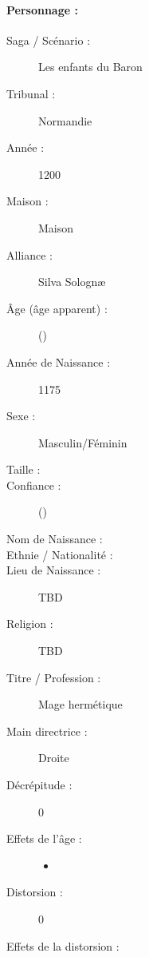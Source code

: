\pagestyle{fancy}
\thispagestyle{plain}
{\Large \paragraph*{\Large Personnage :} \magusname}
\begin{multicols}{2}
\begin{description}
\item[Saga / Scénario :] Les enfants du Baron
\item[Tribunal :] Normandie
\item[Année :] 1200
\item[Maison :] Maison
\item[Alliance :] Silva Solognæ
\item[Âge (âge apparent) :] \magusage{} (\magusapparentage)
\item[Année de Naissance :] 1175
\item[Sexe :] Masculin/Féminin
\item[Taille :] \magussize
\item[Confiance :] \magusconfidencescore{} (\magusconfidencepts)
\columnbreak
\item[Nom de Naissance :] \magusbirthname
\item[Ethnie /  Nationalité :]
\item[Lieu de Naissance :] TBD
\item[Religion :] TBD
\item[Titre / Profession :] Mage hermétique
\item[Main directrice :] Droite
\vspace{-1em}
\end{description}
\end{multicols}
\begin{multicols}{2}
\begin{description}
\item[Décrépitude :] 0
\item[Effets de l'âge :]\hspace{0pt}
\begin{itemize}
\item
\end{itemize}
\columnbreak
\item[Distorsion :] 0
\item[Effets de la distorsion :]\hspace{0pt}
\magusscarslong
\end{description}
\end{multicols}
